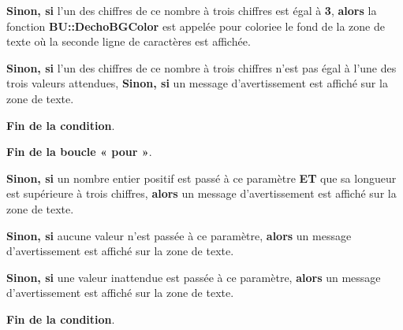 \documentclass[a4paper,10pt]{article}
\begin{document}
\begin{itemize}
{\begin{justify}
{\begin{itemize}
{                        \begin{justify}
                            \textbf{\color{brick}Sinon, si} l'un des chiffres de ce nombre à trois chiffres est égal à \textbf{3}, \textbf{\color{brick}alors} la fonction \textbf{\color{mauve}BU::DechoBGColor} est appelée pour coloriee le fond de la zone de texte où la seconde ligne de caractères est affichée.
                        \end{justify}\setlength{\parskip}{1em}

                        \begin{justify}
                            \textbf{\color{brick}Sinon, si} l'un des chiffres de ce nombre à trois chiffres n'est pas égal à l'une des trois valeurs attendues, \textbf{\color{brick}Sinon, si} un message d'avertissement est affiché sur la zone de texte.
                        \end{justify}\setlength{\parskip}{1em}

                        \begin{justify}
                            \textbf{\color{brick}Fin de la condition}.
                        \end{justify}
                    }
                \end{itemize}

                \begin{justify}
                    \textbf{\color{cyan}Fin de la boucle « pour »}.
                \end{justify}
            }
        \end{justify}

        \item
        {
            \begin{justify}
                \textbf{\color{brick}Sinon, si} un nombre entier positif est passé à ce paramètre \textbf{ET} que sa longueur est supérieure à trois chiffres, \textbf{\color{brick}alors} un message d'avertissement est affiché sur la zone de texte.
            \end{justify}\setlength{\parskip}{1em}

            \begin{justify}
                \textbf{\color{brick}Sinon, si} aucune valeur n'est passée à ce paramètre, \textbf{\color{brick}alors} un message d'avertissement est affiché sur la zone de texte.
            \end{justify}

            \begin{justify}
                \textbf{\color{brick}Sinon, si} une valeur inattendue est passée à ce paramètre, \textbf{\color{brick}alors} un message d'avertissement est affiché sur la zone de texte.
            \end{justify}

            \begin{justify}
                \textbf{\color{brick}Fin de la condition}.
            \end{justify}
        }
    }
\end{itemize}
\end{document}
